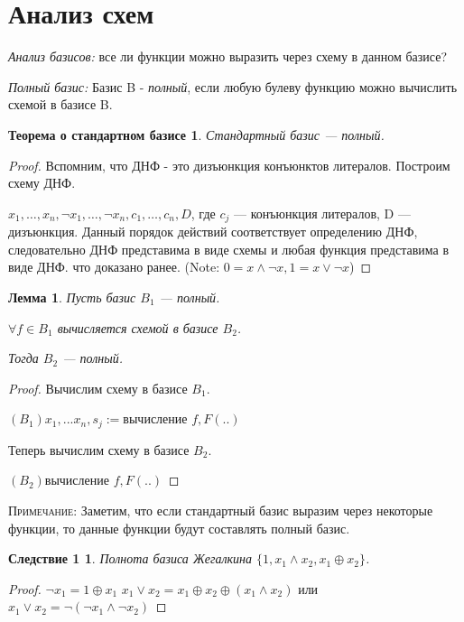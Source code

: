 \documentclass[a4paper, 12pt]{article}
\newtheorem*{standartbase}{Теорема о стандартном базисе}
\newtheorem*{fulllemma}{Лемма}
\newtheorem*{sl1}{Следствие 1}
\begin{document}
 \section*{Анализ схем}
 
 \textit{Анализ базисов: } все ли функции можно выразить через схему в данном базисе?
 
 \textit{Полный базис: } Базис B - \textit{полный}, если любую булеву функцию можно вычислить схемой в базисе B.
 
 \begin{standartbase}
 Стандартный базис --- полный.
 \end{standartbase}
 \begin{proof}
Вспомним, что ДНФ - это дизъюнкция конъюнктов литералов. Построим схему ДНФ.

$x_1, \ldots ,x_n, \lnot x_1, \ldots ,\lnot x_n, c_1, \ldots ,c_n, D$, где $c_j$ --- конъюнкция литералов, D --- дизъюнкция. Данный порядок действий соответствует определению ДНФ, следовательно ДНФ представима в виде схемы и любая функция представима в виде ДНФ. что доказано ранее. (Note: $0 = x \wedge \lnot x, 1 = x \vee \lnot x$)
\end{proof}

 \begin{fulllemma}
Пусть базис $B_1$ --- полный.

$\forall f \in B_1$ вычисляется схемой в базисе $B_2$.

Тогда $B_2$ --- полный.
 \end{fulllemma}
 \begin{proof}
 Вычислим схему в базисе $B_1$.
 
$(B_1) x_1,... x_n,s_j := $вычисление $f, F(..)$

Теперь вычислим схему в базисе $B_2$.

$(B_2) 			   $вычисление $f, F(..)$

\end{proof}
\textsc{Примечание: } Заметим, что если стандартный базис выразим через некоторые функции, то данные функции будут составлять полный базис.

\begin{sl1}
Полнота базиса Жегалкина $\{1, x_1 \wedge x_2, x_1 \oplus x_2\}$.
\end{sl1}
\begin{proof}
$\lnot x_1 = 1 \oplus x_1$ $x_1 \vee x_2 = x_1 \oplus x_2 \oplus (x_1 \wedge x_2)$ или $x_1 \vee x_2 = \lnot (\lnot x_1 \wedge \lnot x_2)$
\end{proof}
\end{document}
